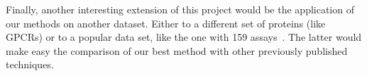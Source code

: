 \documentclass[10pt]{article}
\begin{document}
Finally, another interesting extension of this project would be the application of our methods on another dataset. Either to a different set of proteins (like GPCRs) or to a popular data set, like the one with 159 assays~\cite{martin2017profile}. The latter would make easy the comparison of our best method with other previously published techniques. 

\clearpage
  

\end{document}
